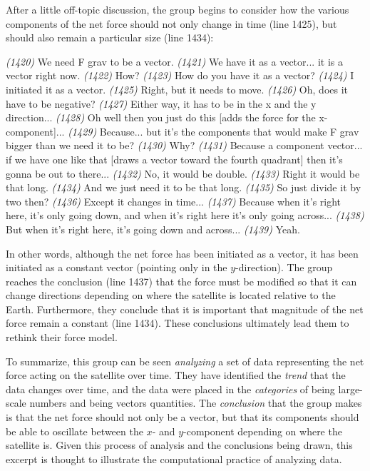 \documentclass{msuphddissertation}
\begin{document}
\begin{doublespace}
After a little off-topic discussion, the group begins to consider how the various components of the net force should not only change in time (line 1425), but should also remain a particular size (line 1434):  \begin{description}
\SB \textit{(1420)} We need F grav to be a vector.
\SD \textit{(1421)} We have it as a vector... it is a vector right now.
\SB \textit{(1422)} How?
\SA \textit{(1423)} How do you have it as a vector?
\SD \textit{(1424)} I initiated it as a vector.
\SB \textit{(1425)} Right, but it needs to move.
\SD \textit{(1426)} Oh, does it have to be negative?
\SB \textit{(1427)} Either way, it has to be in the x and the y direction...
\SD \textit{(1428)} Oh well then you just do this [adds the force for the x-component]...
\SB \textit{(1429)} Because... but it's the components that would make F grav bigger than we need it to be?
\SD \textit{(1430)} Why?
\SB \textit{(1431)} Because a component vector... if we have one like that [draws a vector toward the fourth quadrant] then it's gonna be out to there...
\SC \textit{(1432)} No, it would be double.
\SB \textit{(1433)} Right it would be that long.
\SB \textit{(1434)} And we just need it to be that long.
\SD \textit{(1435)} So just divide it by two then?
\SB \textit{(1436)} Except it changes {in time}...
\SB \textit{(1437)} Because when it's right here, it's only going down, and when it's right here it's only going across...
\SB \textit{(1438)} But when it's right here, it's going down and across...
\SC \textit{(1439)} Yeah.
\end{description}  In other words, although the net force has been initiated as a vector, it has been initiated as a constant vector (pointing only in the $y$-direction).  The group reaches the conclusion (line 1437) that the force must be modified so that it can change directions depending on where the satellite is located relative to the Earth.  Furthermore, they conclude that it is important that magnitude of the net force remain a constant (line 1434).  These conclusions ultimately lead them to rethink their force model.

To summarize, this group can be seen \textit{analyzing} a set of data representing the net force acting on the satellite over time.  They have identified the \textit{trend} that the data changes over time, and the data were placed in the \textit{categories} of being large-scale numbers and being vectors quantities.  The \textit{conclusion} that the group makes is that the net force should not only be a vector, but that its components should be able to oscillate between the $x$- and $y$-component depending on where the satellite is.  Given this process of analysis and the conclusions being drawn, this excerpt is thought to illustrate the computational practice of analyzing data.


\end{doublespace}
\end{document}

